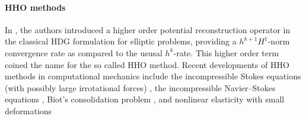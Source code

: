 \paragraph{HHO methods}

In \cite{di_pietro_hybrid_2015, di_pietro_arbitrary-order_2014}, the authors introduced a higher order potential reconstruction operator in the classical HDG formulation for elliptic problems, providing a $h^{k+1} H^1$-norm convergence rate as compared to the ususal $h^k$-rate. This higher order term coined the name for the so called HHO method.
Recent developments of HHO methods in
computational mechanics include the incompressible Stokes
equations (with possibly large irrotational forces) \cite{di_pietro_discontinuous_2016}, the
incompressible Navier–Stokes equations \cite{di_pietro_hybrid_2018}, Biot’s consolidation problem \cite{boffi_nonconforming_2016}, and nonlinear elasticity with small
deformations \cite{botti_hybrid_2017}



